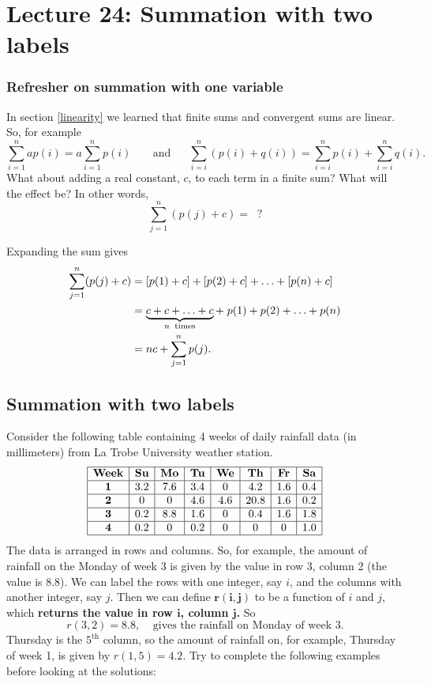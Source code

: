 \chapter{Lecture 24: Summation with two labels}

\subsection{Refresher on summation with one variable}
In section \ref{linearity} we learned that finite sums and convergent sums are linear. So, for example
\[
\sum_{i=1}^n ap(i) = a\sum_{i=1}^np(i) \;\;\;\;\;\;\; \text{and} \;\;\;\;\;\; \sum_{i = i}^n (p(i) + q(i)) =  \sum_{i = i}^np(i) + \sum_{i = i}^nq(i).
\]
What about adding a real constant, $c$, to each term in a finite sum? What will the effect be? In other words,
\[
\sum_{j=1}^n (p(j) + c) = \;\; ?
\]

\solution 
Expanding the sum gives
\begin{align*}
\sum_{j=1}^n (p(j) + c) & = \left[p(1) + c\right] +  \left[p(2) + c\right] + \ldots +  \left[p(n) + c\right] \\
	& = \underbrace{c + c + \ldots + c}_{n \;\; \text{times}} + \; p(1) + p(2) + \ldots + p(n) \\
	& = nc + \sum_{j=1}^n p(j).
\end{align*}

\section{Summation with two labels} \label{r(i,j)}
Consider the following table containing 4 weeks of daily rainfall data (in millimeters) from La Trobe University weather station.
\[
\begin{array}{|c|c|c|c|c|c|c|c|} \hline
\textbf{Week} & \textbf{Su} & \textbf{Mo} & \textbf{Tu} & \textbf{We} & \textbf{Th} & \textbf{Fr} & \textbf{Sa} \\ \hline
\boldsymbol{1} &3.2  	       &7.6 		   &3.4           &0		&4.2       	&1.6		    &0.4		
\\ \hline
\boldsymbol{2}&0    	       &0 		   &4.6           &4.6		&20.8       	&1.6		    &0.2	
\\ \hline
\boldsymbol{3}&0.2  	       &8.8 		   &1.6           &0		&0.4       	&1.6		    &1.8	
\\ \hline
\boldsymbol{4}&0.2    	       &0   		   &0.2           &0		&0       	&0		    &1.0 
\\ \hline
\end{array}
\]
The data is arranged in rows and columns. So, for example, the amount of rainfall on the Monday of week 3 is given by the value in row 3, column 2 (the value is 8.8). We can label the rows with one integer, say $i$, and the columns with another integer, say $j$. Then we can define $\boldsymbol{r(i,j)}$ to be a function of $i$ and $j$, which \textbf{returns the value in row $\boldsymbol{i}$, column $\boldsymbol{j}$.} So
\[
r(3,2) = 8.8, \;\;\;\; \text{gives the rainfall on Monday of week 3.}
\]
Thursday is the $5^\text{th}$ column, so the amount of rainfall on, for example, Thursday of week 1, is given by $r(1,5) = 4.2$. Try to complete the following examples before looking at the solutions: \\

